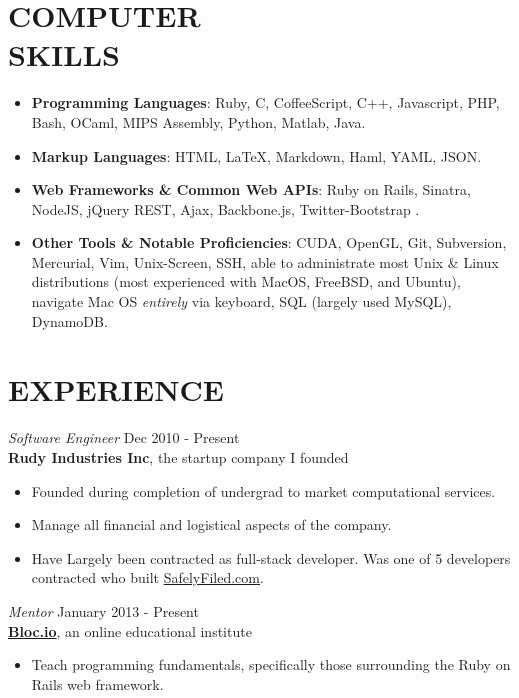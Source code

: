\documentclass[margin]{res}
\begin{document}
\begin{resume}
\section{COMPUTER \\ SKILLS} 
  \begin{itemize}  
    \small
    \itemsep -2pt %
    \item {\bf Programming Languages}: {\footnotesize Ruby, C, CoffeeScript, C++, 
      Javascript, PHP, Bash, OCaml, MIPS Assembly, Python, Matlab, Java}.
    \item {\bf Markup Languages}: {\footnotesize HTML, \LaTeX, Markdown, Haml, YAML, JSON}.
    \item {\bf Web Frameworks \& Common Web APIs}: {\footnotesize Ruby on Rails, Sinatra, NodeJS, jQuery
      REST, Ajax, Backbone.js, Twitter-Bootstrap} .
    \item {\bf Other Tools \& Notable Proficiencies}: 
      {\footnotesize CUDA, OpenGL, Git, Subversion, Mercurial, Vim, Unix-Screen, 
      SSH, able to administrate most Unix \& Linux distributions 
      (most experienced with MacOS, FreeBSD, and Ubuntu), navigate
      Mac OS \emph{entirely} via keyboard, SQL (largely used MySQL), DynamoDB}.
  \end{itemize}

\section{EXPERIENCE} 
  {\sl Software Engineer} \hfill Dec 2010 - Present \\
  {\bf Rudy Industries Inc}, the startup company I founded
  \begin{itemize}  
    \itemsep -2pt %
    \item Founded during completion of undergrad to market computational
      services.
    \item Manage all financial and logistical aspects of the company.
    \item Have Largely been contracted as full-stack developer. Was one of 5 developers contracted who built
      \href{https://safelyfiled.com/home/}{SafelyFiled.com}.
    \end{itemize}
 
  {\sl Mentor} \hfill January 2013 - Present \\
    {\bf \href{https://www.bloc.io/}{Bloc.io}}, an online educational institute 
    \begin{itemize}  
        \item Teach programming fundamentals, specifically those
        surrounding the Ruby on Rails web framework.
     \end{itemize} 
 

\end{resume}
\end{document}
